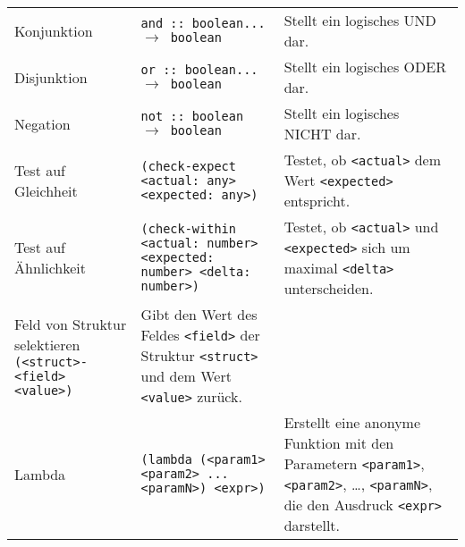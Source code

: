 \begin{sidewaystable}
\begin{tabular}{p{5cm} | p{7cm} | p{9cm}}
					\hline
					Konjunktion                                                       & \texttt{and :: boolean... $ \rightarrow $ boolean}                                                             & Stellt ein logisches UND dar.                                                                                                                                 \\
					Disjunktion                                                       & \texttt{or :: boolean... $ \rightarrow $ boolean}                                                              & Stellt ein logisches ODER dar.                                                                                                                                \\
					Negation                                                          & \texttt{not :: boolean $ \rightarrow $ boolean}                                                                & Stellt ein logisches NICHT dar.                                                                                                                               \\
					\hline
					Test auf Gleichheit                                               & \texttt{(check-expect <actual: any> <expected: any>)}                                                          & Testet, ob \texttt{<actual>} dem Wert \texttt{<expected>} entspricht.                                                                                         \\
					Test auf Ähnlichkeit                                              & \texttt{(check-within <actual: number> <expected: number> <delta: number>)}                                    & Testet, ob \texttt{<actual>} und \texttt{<expected>} sich um maximal \texttt{<delta>} unterscheiden.                                                          \\
					\hline
					Feld von Struktur selektieren \texttt{(<struct>-<field> <value>)} & Gibt den Wert des Feldes \texttt{<field>} der Struktur \texttt{<struct>} und dem Wert \texttt{<value>} zurück.                                                                                                                                                                 \\
					\hline
					Lambda                                                            & \texttt{(lambda (<param1> <param2> ... <paramN>) <expr>)}                                                      & Erstellt eine anonyme Funktion mit den Parametern \texttt{<param1>}, \texttt{<param2>}, \dots, \texttt{<paramN>}, die den Ausdruck \texttt{<expr>} darstellt. \\

\end{tabular}
\end{sidewaystable}
